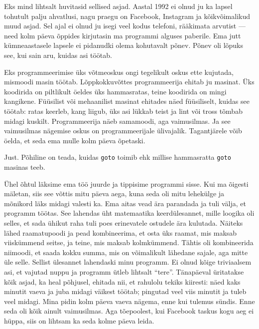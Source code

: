 
Eks mind lihtsalt huvitasid sellised asjad. Aastal 1992 ei olnud ju ka lapsel 
tohutult palju ahvatlusi, nagu praegu on 
Facebook, Instagram ja kõikvõimalikud 
muud asjad. Sel ajal ei olnud ju isegi veel kodus telefoni, rääkimata arvutist 
--- need kolm päeva õppides kirjutasin ma programmi  
alguses paberile. Ema jutt kümneaastasele lapsele ei pidanudki olema
kohutavalt põnev. Põnev oli lõpuks  
see, kui sain aru, kuidas asi töötab.


Eks programmeerimise üks võtmeoskus ongi tegelikult 
oskus ette kujutada, mismoodi masin töötab. Lõppkokkuvõttes  
programmeerija ehitab ju masinat. Üks koodirida on 
piltlikult öeldes üks hammasratas, teine koodirida on mingi kangikene. 
Füüsilist või mehaanilist 
masinat ehitades näed füüsiliselt, kuidas see töötab: ratas keerleb, 
kang liigub, üks asi lükkab teist ja 
lint või tross tõmbab midagi kuskilt. 
Programmeerija näeb samamoodi, aga vaimusilmas. Ja see vaimusilmas nägemise 
oskus on 
programmeerijale ülivajalik. Tagantjärele võib öelda, et seda ema mulle 
kolm päeva õpetaski.


Just. Põhiline on teada, kuidas \verb|goto| toimib ehk 
millise hammasratta \verb|goto| masinas teeb.


Ühel õhtul läksime ema töö juurde ja  
tippisime programmi sisse. Kui ma õigesti mäletan, siis see
võttis mitu päeva aega, kuna seda oli mitu lehekülge ja mõnikord läks midagi 
valesti ka. Ema aitas vead ära parandada ja tuli välja, et programm 
töötas. See lahendas üht matemaatika keerdülesannet, mille
loogika oli selles, et sada ühikut raha tuli poes erinevatele ostudele ära 
kulutada. Näiteks lähed 
raamatupoodi ja pead 
kombineerima, et osta üks raamat, mis maksab viiskümmend seitse, ja teine, mis 
maksab kolmkümmend. Tähtis oli kombineerida niimoodi, et saada kokku summa, mis 
on võimalikult 
lähedane sajale, aga mitte üle selle. Sellist ülesannet lahendaski minu 
programm. Ei olnud kõige triviaalsem asi, et 
vajutad nuppu ja programm ütleb lihtsalt \enquote{tere}. Tänapäeval üritatakse 
kõik asjad, ka heal põhjusel, ehitada nii, et rahulolu tekiks 
kiiresti: näed kaks minutit vaeva ja 
juba midagi väikest töötab; pingutad veel viis minutit 
ja tuleb veel midagi. Mina pidin kolm päeva vaeva nägema, enne 
kui tulemus sündis. Enne seda oli kõik ainult vaimusilmas. Aga tõepoolest, kui 
Facebook taskus kogu aeg ei hüppa, siis on lihtsam ka seda kolme 
päeva leida. 


